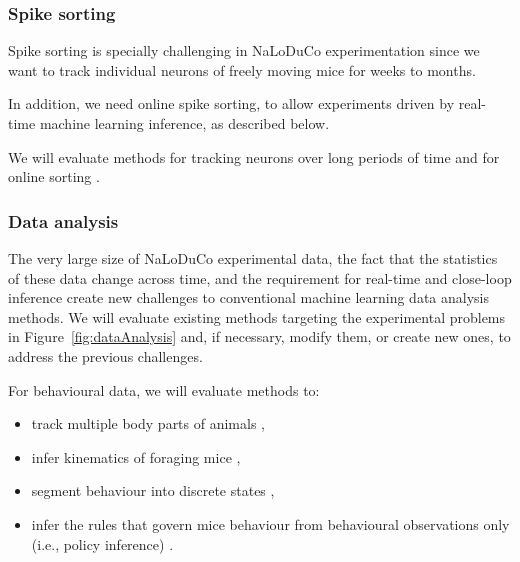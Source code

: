\subsubsection{Spike sorting}

Spike sorting is specially challenging in NaLoDuCo experimentation since we
want to track individual neurons of freely moving mice for weeks to months.

In addition, we need online spike sorting, to allow experiments driven
by real-time machine learning inference, as described below.

We will evaluate methods for tracking neurons over long periods of time
\citep[e.g.,][]{natal24,concertedly24} and for online sorting
\citep[e.g.,][]{reticently06,nonmetal04}.

\subsubsection{Data analysis}

The very large size of NaLoDuCo experimental data, the fact that the statistics
of these data change across time, and the requirement for real-time and
close-loop inference create new challenges to conventional machine learning
data analysis methods.
%
We will evaluate existing methods targeting the experimental problems
in Figure~\ref{fig:dataAnalysis} and, if necessary, modify them, or create new
ones, to address the previous challenges.

For behavioural data, we will evaluate methods to:

\begin{itemize}

    \item track multiple body parts of
animals \citep[e.g.,][and a switching-linear-dynamical method using RFIDs that
we will develop]{mathisEtAl18,pereiraEtAl22,bidermanEtAl24},

    \item infer kinematics of foraging mice \citep[e.g.,][]{ldspython,challaEtAl11},

    \item segment behaviour into discrete states \citep[e.g.,][and a hierarchical HMM
that we will develop]{wiltschkoEtAl15,hsuAndYttri21},

    \item infer the rules that govern mice behaviour from behavioural observations
only (i.e., policy inference) \citep[e.g.,][]{ziebartEtAl08,zhuEtAl23}.

\end{itemize}

